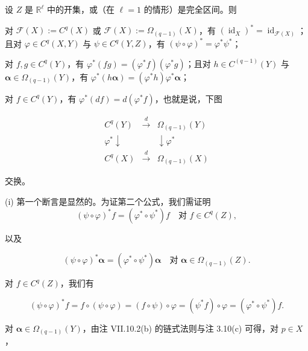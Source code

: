 \begin{proposition}

设 $ Z $ 是 $ \mathbb{R}^{\ell} $ 中的开集，或（在 $ \ell = 1 $ 的情形）是完全区间。则

\begin{subitems}
\item

对 $ \mathcal{F}(X) := C^{q}(X) $ 或 $ \mathcal{F}(X) := \Omega_{(q-1)}(X) $，有 $ (\operatorname{id}_{X})^{*} = \operatorname{id}_{\mathcal{F}(X)} $；且对 $ \varphi \in C^{q}(X,Y) $ 与 $ \psi \in C^{q}(Y,Z) $，有 $ (\psi\circ\varphi)^{*} = \varphi^{*}\psi^{*} $；

\item

对 $ f,g \in C^{q}(Y) $，有 $ \varphi^{*}(fg) = (\varphi^{*}f)(\varphi^{*}g) $；且对 $ h \in C^{(q-1)}(Y) $ 与 $ \boldsymbol{\alpha} \in \Omega_{(q-1)}(Y) $，有 $ \varphi^{*}(h\boldsymbol{\alpha}) = (\varphi^{*}h)\varphi^{*}\boldsymbol{\alpha} $；

\item

对 $ f \in C^{q}(Y) $，有 $ \varphi^{*}(df) = d(\varphi^{*}f) $，也就是说，下图

\begin{equation*}
\begin{array}{ccc} C^{q}(Y) & \xrightarrow{d} & \Omega_{(q-1)}(Y) \\ \varphi^{*}\downarrow & & \downarrow\varphi^{*} \\ C^{q}(X) & \xrightarrow{d} & \Omega_{(q-1)}(X) \end{array}
\end{equation*}

交换。

\proofhead
(i) 第一个断言是显然的。为证第二个公式，我们需证明
\[
(\psi\circ\varphi)^{*}f = (\varphi^{*}\circ\psi^{*})f \quad \text{对 } f \in C^{q}(Z) ,
\]

以及

\[
(\psi\circ\varphi)^{*}\boldsymbol{\alpha} = (\varphi^{*}\circ\psi^{*})\boldsymbol{\alpha} \quad \text{对 } \boldsymbol{\alpha} \in \Omega_{(q-1)}(Z) .
\]

对 $ f \in C^{q}(Z) $，我们有

\[
(\psi\circ\varphi)^{*}f = f\circ(\psi\circ\varphi) = (f\circ\psi)\circ\varphi = (\psi^{*}f)\circ\varphi = (\varphi^{*}\circ\psi^{*})f .
\]

对 $ \boldsymbol{\alpha} \in \Omega_{(q-1)}(Y) $，由注 VII.10.2(b) 的链式法则与注 3.10(c) 可得，对 $ p \in X $，


\end{subitems}
\end{proposition}
